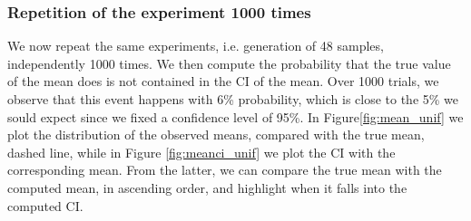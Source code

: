 \documentclass[twoside,onecolumn]{article}
\theoremstyle{definition}
\begin{document}
\subsubsection{Repetition of the experiment 1000 times}
We now repeat the same experiments, i.e. generation of 48 samples, independently 1000 times. We then compute the probability that the true value of the mean does is not contained in the CI of the mean. Over 1000 trials, we observe that this event happens with 6\% probability, which is close to the 5\% we sould expect since we fixed a confidence level of 95\%.
In Figure\ref{fig:mean_unif} we plot the distribution of the observed means, compared with the true mean, dashed line, while in Figure \ref{fig:meanci_unif} we plot the CI with the corresponding mean. From the latter, we can compare the true mean with the computed mean, in ascending order, and highlight when it falls into the computed CI.
\end{document}
